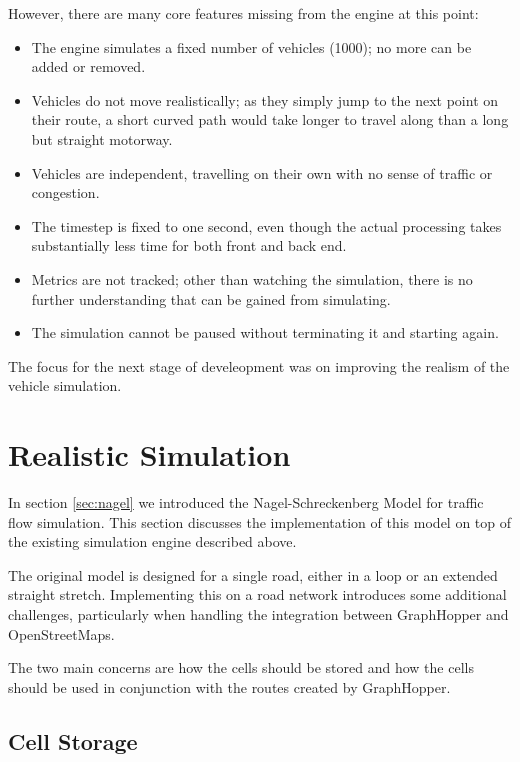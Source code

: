 \documentclass[ %
                    author={Alexander Hill},
                supervisor={Dr. Benjamin Sach},
                    degree={MEng},
                     title={MARMOSET},
                  subtitle={Multi-Agent Route Management using Online Simulation for Efficient Transportation},
                      type={research},
                      year={2016} ]{dissertation}
\begin{document}
However, there are many core features missing from the engine at this point:

\begin{itemize}
    \item The engine simulates a fixed number of vehicles (1000); no more can
        be added or removed.
    \item Vehicles do not move realistically; as they simply jump to the next
        point on their route, a short curved path would take longer to
        travel along than a long but straight motorway.
    \item Vehicles are independent, travelling on their own with no sense
        of traffic or congestion.
    \item The timestep is fixed to one second, even though the actual processing
        takes substantially less time for both front and back end.
    \item Metrics are not tracked; other than watching the simulation, there is
        no further understanding that can be gained from simulating.
    \item The simulation cannot be paused without terminating it and starting
        again.
\end{itemize}

The focus for the next stage of develeopment was on improving the realism of the
vehicle simulation.

\section{Realistic Simulation}\label{sec:nagel-impl}

In section \ref{sec:nagel} we introduced the Nagel-Schreckenberg Model for
traffic flow simulation. This section discusses the implementation of this model
on top of the existing simulation engine described above.

The original model is designed for a single road, either in a loop or an
extended straight stretch. Implementing this on a road network introduces some
additional challenges, particularly when handling the integration between
GraphHopper and OpenStreetMaps.

The two main concerns are how the cells should be stored and how the cells
should be used in conjunction with the routes created by GraphHopper.

\subsection{Cell Storage}
\end{document}
